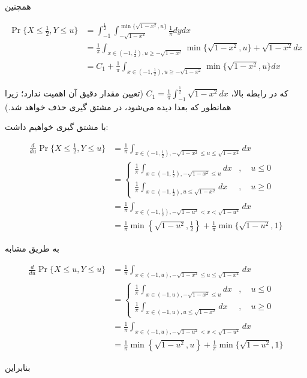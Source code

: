 \documentclass[10pt,letterpaper]{report}
\newcommand{\eqn}[1]{
\[\begin{split}
#1
\end{split}\]
}
\begin{document}
همچنین
\eqn{
\Pr\{X\le \frac{1}{2},Y\le u\}&=
\int_{-1}^{\frac{1}{2}}
\int_{-\sqrt{1-x^2}}^{\min\{\sqrt{1-x^2},u\}}\frac{1}{\pi}dydx
\\&=
\frac{1}{\pi}
\int_{x\in(-1,\frac{1}{2}),u\ge -\sqrt{1-x^2}}
\min\{\sqrt{1-x^2},u\}+\sqrt{1-x^2}dx
\\&=
C_1+\frac{1}{\pi}
\int_{x\in(-1,\frac{1}{2}),u\ge -\sqrt{1-x^2}}
\min\{\sqrt{1-x^2},u\}dx
}
که در رابطه بالا، 
$
C_1=\frac{1}{\pi}
\int_{-1}^{\frac{1}{2}}
\sqrt{1-x^2}dx
$
(تعیین مقدار دقیق آن اهمیت ندارد؛ زیرا همانطور که بعدا دیده می‌شود، در مشتق گیری حذف خواهد شد.)

با مشتق گیری خواهیم داشت:
\eqn{
\frac{d}{du}
\Pr\{X\le \frac{1}{2},Y\le u\}
&=
\frac{1}{\pi}\int_{x\in(-1,\frac{1}{2}),-\sqrt{1-x^2}\le u\le \sqrt{1-x^2}}dx
\\&=
\begin{cases}
\frac{1}{\pi}\int_{x\in(-1,\frac{1}{2}),-\sqrt{1-x^2}\le u}dx&,\quad u\le 0\\
\frac{1}{\pi}\int_{x\in(-1,\frac{1}{2}),u\le \sqrt{1-x^2}}dx&,\quad u\ge 0
\end{cases}
\\&=
\frac{1}{\pi}\int_{x\in(-1,\frac{1}{2}),-\sqrt{1-u^2}<x<\sqrt{1-u^2}}dx
\\&=
\frac{1}{\pi}\min\left\{\sqrt{1-u^2},\frac{1}{2}\right\}+\frac{1}{\pi}\min\{\sqrt{1-u^2},1\}
}

به طریق مشابه

\eqn{
\frac{d}{du}
\Pr\{X\le u,Y\le u\}
&=
\frac{1}{\pi}\int_{x\in(-1,u),-\sqrt{1-x^2}\le u\le \sqrt{1-x^2}}dx
\\&=
\begin{cases}
\frac{1}{\pi}\int_{x\in(-1,u),-\sqrt{1-x^2}\le u}dx&,\quad u\le 0\\
\frac{1}{\pi}\int_{x\in(-1,u),u\le \sqrt{1-x^2}}dx&,\quad u\ge 0
\end{cases}
\\&=
\frac{1}{\pi}\int_{x\in(-1,u),-\sqrt{1-u^2}<x<\sqrt{1-u^2}}dx
\\&=
\frac{1}{\pi}\min\left\{\sqrt{1-u^2},u\right\}+\frac{1}{\pi}\min\{\sqrt{1-u^2},1\}
}
بنابراین

\end{document}

